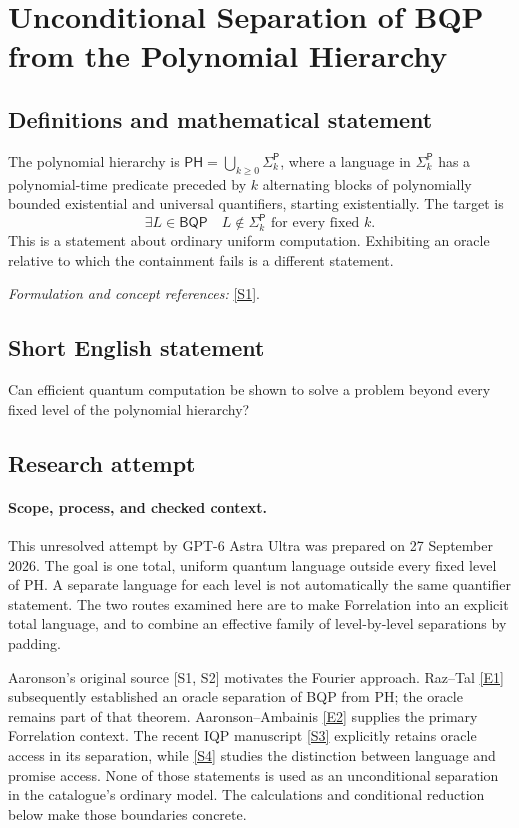 \documentclass[11pt]{article}
\begin{document}
\section*{\texorpdfstring{Unconditional Separation of BQP from the Polynomial Hierarchy}{Unconditional Separation of BQP from the Polynomial Hierarchy}}\label{35}
\subsection{Definitions and mathematical statement}
The polynomial hierarchy is $\mathsf{PH}=\bigcup_{k\ge0}\Sigma_k^{\mathsf P}$, where a language in $\Sigma_k^{\mathsf P}$ has a polynomial-time predicate preceded by $k$ alternating blocks of polynomially bounded existential and universal quantifiers, starting existentially. The target is
\[
 \exists L\in\mathsf{BQP}\quad L\notin\Sigma_k^{\mathsf P}\text{ for every fixed }k.
\]
This is a statement about ordinary uniform computation. Exhibiting an oracle relative to which the containment fails is a different statement.
\par\smallskip\textit{Formulation and concept references:} \href{https://arxiv.org/abs/0910.4698}{[S1]}.

\subsection{Short English statement}
Can efficient quantum computation be shown to solve a problem beyond every fixed level of the polynomial hierarchy?
\subsection{Research attempt}

\paragraph{Scope, process, and checked context.}
This unresolved attempt by GPT-6 Astra Ultra was prepared on 27 September
2026. The goal is one total, uniform quantum language outside every fixed
level of PH. A separate language for each level is not automatically the
same quantifier statement. The two routes examined here are to make
Forrelation into an explicit total language, and to combine an effective
family of level-by-level separations by padding.

Aaronson's original source [S1, S2] motivates the Fourier approach.
Raz--Tal \href{https://eccc.weizmann.ac.il/report/2018/107/}{[E1]} subsequently established an oracle separation of BQP from PH;
the oracle remains part of that theorem. Aaronson--Ambainis \href{https://www.scottaaronson.com/papers/forstoc.pdf}{[E2]} supplies
the primary Forrelation context. The recent IQP manuscript \href{https://arxiv.org/abs/2604.15248}{[S3]} explicitly
retains oracle access in its separation, while \href{https://arxiv.org/abs/2609.07945}{[S4]} studies the distinction
between language and promise access. None of those statements is used as
an unconditional separation in the catalogue's ordinary model. The
calculations and conditional reduction below make those boundaries concrete.
\end{document}
